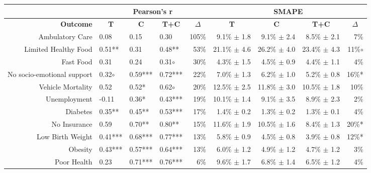 \begin{table*}[t]
\centering
\begin{tabular}{|r|l|l|l|r||r|r|r|r|}
\hline
 & \multicolumn{4}{c||}{{\bf Pearson's r}} & \multicolumn{4}{c|}{{\bf SMAPE}} \\
 \hline 
{\bf Outcome} &	 \multicolumn{1}{c|}{{\bf T}} &	 \multicolumn{1}{c|}{{\bf C}} &	 \multicolumn{1}{c|}{{\bf T+C}} &	 \multicolumn{1}{c||}{$\Delta$} &	 \multicolumn{1}{c|}{{\bf T}} &	 \multicolumn{1}{c|}{{\bf C}} &	 \multicolumn{1}{c|}{{\bf T+C}} &	 \multicolumn{1}{c|}{$\Delta$}\\
\hline
               Ambulatory Care 	 & 0.08 	 & 0.15 	 & 0.30 	 & 105\% 	 & 9.1\% $\pm$ 1.8 	 & 9.1\% $\pm$ 2.4 	 & 8.5\% $\pm$ 2.1 	 & 7\%\\
          Limited Healthy Food 	 & 0.51** 	 & 0.31 	 & 0.48** 	 & 53\% 	 & 21.1\% $\pm$ 4.6 	 & 26.2\% $\pm$ 4.0 	 & 23.4\% $\pm$ 4.3 	 & 11\%$\circ$\\
                     Fast Food 	 & 0.31 	 & 0.24 	 & 0.31$\circ$ 	 & 30\% 	 & 4.3\% $\pm$ 1.5 	 & 4.5\% $\pm$ 0.9 	 & 4.4\% $\pm$ 1.1 	 & 4\%\\
    No socio-emotional support 	 & 0.32$\circ$ 	 & 0.59*** 	 & 0.72*** 	 & 22\% 	 & 7.0\% $\pm$ 1.3 	 & 6.2\% $\pm$ 1.0 	 & 5.2\% $\pm$ 0.8 	 & 16\%*\\
             Vehicle Mortality 	 & 0.52 	 & 0.52* 	 & 0.62$\circ$ 	 & 20\% 	 & 12.5\% $\pm$ 2.5 	 & 11.8\% $\pm$ 3.0 	 & 10.5\% $\pm$ 1.8 	 & 10\%\\
                  Unemployment 	 & -0.11 	 & 0.36* 	 & 0.43*** 	 & 19\% 	 & 10.1\% $\pm$ 1.4 	 & 9.1\% $\pm$ 3.5 	 & 8.9\% $\pm$ 2.3 	 & 2\%\\
                      Diabetes 	 & 0.35** 	 & 0.45** 	 & 0.53*** 	 & 17\% 	 & 1.4\% $\pm$ 0.2 	 & 1.3\% $\pm$ 0.2 	 & 1.3\% $\pm$ 0.1 	 & 4\%\\
                  No Insurance 	 & 0.59 	 & 0.70** 	 & 0.80** 	 & 15\% 	 & 11.6\% $\pm$ 1.9 	 & 10.5\% $\pm$ 1.6 	 & 8.4\% $\pm$ 1.3 	 & 20\%*\\
              Low Birth Weight 	 & 0.41*** 	 & 0.68*** 	 & 0.77*** 	 & 13\% 	 & 5.8\% $\pm$ 0.9 	 & 4.5\% $\pm$ 0.8 	 & 3.9\% $\pm$ 0.8 	 & 12\%*\\
                       Obesity 	 & 0.43*** 	 & 0.57*** 	 & 0.64*** 	 & 13\% 	 & 6.0\% $\pm$ 1.2 	 & 4.9\% $\pm$ 1.2 	 & 4.7\% $\pm$ 1.2 	 & 3\%\\
                   Poor Health 	 & 0.23 	 & 0.71*** 	 & 0.76*** 	 & 6\% 	 & 9.6\% $\pm$ 1.7 	 & 6.8\% $\pm$ 1.4 	 & 6.5\% $\pm$ 1.2 	 & 4\%\\

\end{tabular}
\end{table*}
